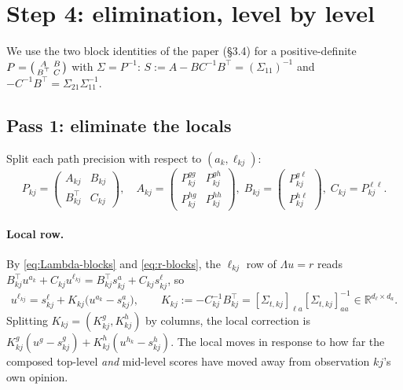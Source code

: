 \documentclass[11pt]{article}
\theoremstyle{definition}
\theoremstyle{remark}
\newcommand{\R}{\mathbb{R}}
\newcommand{\T}{\top}
\newcommand{\hk}{h_k}
\newcommand{\lkj}{\ell_{kj}}
\newcommand{\ak}{a_k}          %
\begin{document}
\section{Step 4: elimination, level by level}\label{sec:elimination}

We use the two block identities of the paper (\S3.4) for a positive-definite
$P=\begin{psmallmatrix}A&B\\B^\T&C\end{psmallmatrix}$ with $\Sigma=P^{-1}$:
$S:=A-BC^{-1}B^\T=(\Sigma_{11})^{-1}$ and $-C^{-1}B^\T=\Sigma_{21}\Sigma_{11}^{-1}$.

\subsection{Pass 1: eliminate the locals}

Split each path precision with respect to $(\ak,\lkj)$:
\[
P_{kj}=\begin{pmatrix}A_{kj}&B_{kj}\\B_{kj}^\T&C_{kj}\end{pmatrix},\quad
A_{kj}=\begin{pmatrix}P^{gg}_{kj}&P^{gh}_{kj}\\P^{hg}_{kj}&P^{hh}_{kj}\end{pmatrix},\;
B_{kj}=\begin{pmatrix}P^{g\ell}_{kj}\\P^{h\ell}_{kj}\end{pmatrix},\;
C_{kj}=P^{\ell\ell}_{kj}.
\]
\paragraph{Local row.} By \eqref{eq:Lambda-blocks} and \eqref{eq:r-blocks}, the
$\lkj$ row of $\Lambda u=r$ reads $B_{kj}^\T u^{\ak}+C_{kj}u^{\lkj}=B_{kj}^\T s^a_{kj}+C_{kj}s^\ell_{kj}$, so
\begin{equation}\label{eq:local}
u^{\lkj}=s^\ell_{kj}+K_{kj}\big(u^{\ak}-s^a_{kj}\big),\qquad K_{kj}:=-C_{kj}^{-1}B_{kj}^\T=[\Sigma_{t,kj}]_{\ell a}[\Sigma_{t,kj}]_{aa}^{-1}\in\R^{d_\ell\times d_a}.
\end{equation}
Splitting $K_{kj}=(K^g_{kj},K^h_{kj})$ by columns, the local correction is
$K^g_{kj}(u^g-s^g_{kj})+K^h_{kj}(u^{\hk}-s^h_{kj})$. The local moves in
response to how far the composed top-level \emph{and} mid-level scores have moved
away from observation $kj$'s own opinion.
\end{document}
